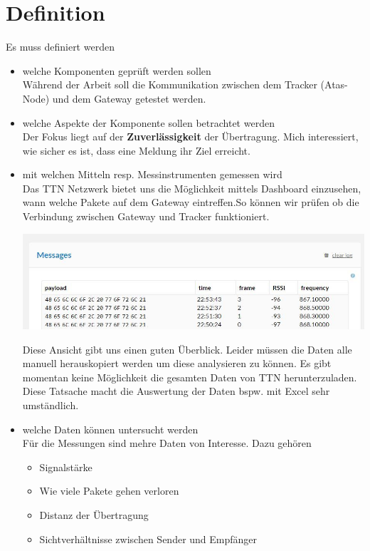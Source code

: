 \documentclass[11pt,english,german]{report}
\theoremstyle{definition}
\begin{document}
\section{Definition}
Es muss definiert werden
\begin{itemize}
	\item welche Komponenten geprüft werden sollen\\[0.3cm]
	Während der Arbeit soll die Kommunikation zwischen dem Tracker (Atas-Node) und dem Gateway getestet werden.
	\item welche Aspekte der Komponente sollen betrachtet werden\\[0.3cm]
	Der Fokus liegt auf der \textbf{Zuverlässigkeit} der Übertragung. Mich interessiert, wie sicher es ist, dass eine Meldung ihr Ziel erreicht. 
	\item mit welchen Mitteln resp. Messinstrumenten gemessen wird\\[0.3cm]	
	Das TTN Netzwerk bietet uns die Möglichkeit mittels Dashboard einzusehen, wann welche Pakete auf dem Gateway eintreffen.So können wir prüfen ob die Verbindung zwischen Gateway und Tracker funktioniert. \\
	
	\begin{minipage}{\linewidth}
		\centering
		\includegraphics[width=\linewidth]{img/ttn_messages}
	\end{minipage}

	Diese Ansicht gibt uns einen guten Überblick. Leider müssen die Daten alle manuell herauskopiert werden um diese analysieren zu können. Es gibt momentan keine Möglichkeit die gesamten Daten von TTN herunterzuladen. Diese Tatsache macht die Auswertung der Daten bspw. mit Excel sehr umständlich.
	
	\item welche Daten können untersucht werden\\[0.3cm]
	Für die Messungen sind mehre Daten von Interesse. Dazu gehören 
	\begin{itemize}
		\item Signalstärke
		\item Wie viele Pakete gehen verloren
		\item Distanz der Übertragung
		\item Sichtverhältnisse zwischen Sender und Empfänger
	\end{itemize}
\end{itemize}
\end{document}
